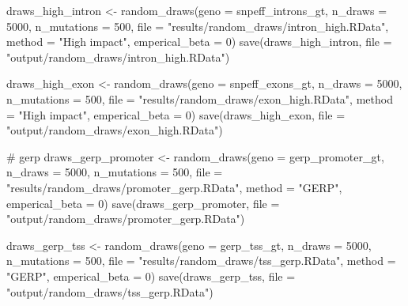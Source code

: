 \documentclass[
  letterpaper,
  DIV=11,
  numbers=noendperiod]{scrreprt}
\newenvironment{Shaded}{}{}
\newcommand{\AttributeTok}[1]{\textcolor[rgb]{0.84,0.23,0.29}{#1}}
\newcommand{\CommentTok}[1]{\textcolor[rgb]{0.42,0.45,0.49}{#1}}
\newcommand{\DecValTok}[1]{\textcolor[rgb]{0.00,0.36,0.77}{#1}}
\newcommand{\FunctionTok}[1]{\textcolor[rgb]{0.44,0.26,0.76}{#1}}
\newcommand{\NormalTok}[1]{\textcolor[rgb]{0.14,0.16,0.18}{#1}}
\newcommand{\OtherTok}[1]{\textcolor[rgb]{0.44,0.26,0.76}{#1}}
\newcommand{\StringTok}[1]{\textcolor[rgb]{0.01,0.18,0.38}{#1}}
\begin{document}
\begin{Shaded}
\begin{Highlighting}[]
\NormalTok{draws\_high\_intron }\OtherTok{\textless{}{-}} \FunctionTok{random\_draws}\NormalTok{(}\AttributeTok{geno =}\NormalTok{ snpeff\_introns\_gt, }\AttributeTok{n\_draws =} \DecValTok{5000}\NormalTok{, }\AttributeTok{n\_mutations =} \DecValTok{500}\NormalTok{, }\AttributeTok{file =} \StringTok{"results/random\_draws/intron\_high.RData"}\NormalTok{, }\AttributeTok{method =} \StringTok{"High impact"}\NormalTok{, }\AttributeTok{emperical\_beta =} \DecValTok{0}\NormalTok{)}
\FunctionTok{save}\NormalTok{(draws\_high\_intron, }\AttributeTok{file =} \StringTok{"output/random\_draws/intron\_high.RData"}\NormalTok{)}

\NormalTok{draws\_high\_exon }\OtherTok{\textless{}{-}} \FunctionTok{random\_draws}\NormalTok{(}\AttributeTok{geno =}\NormalTok{ snpeff\_exons\_gt, }\AttributeTok{n\_draws =} \DecValTok{5000}\NormalTok{, }\AttributeTok{n\_mutations =} \DecValTok{500}\NormalTok{, }\AttributeTok{file =} \StringTok{"results/random\_draws/exon\_high.RData"}\NormalTok{, }\AttributeTok{method =} \StringTok{"High impact"}\NormalTok{, }\AttributeTok{emperical\_beta =} \DecValTok{0}\NormalTok{)}
\FunctionTok{save}\NormalTok{(draws\_high\_exon, }\AttributeTok{file =} \StringTok{"output/random\_draws/exon\_high.RData"}\NormalTok{)}

\CommentTok{\# gerp}
\NormalTok{draws\_gerp\_promoter }\OtherTok{\textless{}{-}} \FunctionTok{random\_draws}\NormalTok{(}\AttributeTok{geno =}\NormalTok{ gerp\_promoter\_gt, }\AttributeTok{n\_draws =} \DecValTok{5000}\NormalTok{, }\AttributeTok{n\_mutations =} \DecValTok{500}\NormalTok{, }\AttributeTok{file =} \StringTok{"results/random\_draws/promoter\_gerp.RData"}\NormalTok{, }\AttributeTok{method =} \StringTok{"GERP"}\NormalTok{, }\AttributeTok{emperical\_beta =} \DecValTok{0}\NormalTok{)}
\FunctionTok{save}\NormalTok{(draws\_gerp\_promoter, }\AttributeTok{file =} \StringTok{"output/random\_draws/promoter\_gerp.RData"}\NormalTok{)}

\NormalTok{draws\_gerp\_tss }\OtherTok{\textless{}{-}} \FunctionTok{random\_draws}\NormalTok{(}\AttributeTok{geno =}\NormalTok{ gerp\_tss\_gt, }\AttributeTok{n\_draws =} \DecValTok{5000}\NormalTok{, }\AttributeTok{n\_mutations =} \DecValTok{500}\NormalTok{, }\AttributeTok{file =} \StringTok{"results/random\_draws/tss\_gerp.RData"}\NormalTok{, }\AttributeTok{method =} \StringTok{"GERP"}\NormalTok{, }\AttributeTok{emperical\_beta =} \DecValTok{0}\NormalTok{)}
\FunctionTok{save}\NormalTok{(draws\_gerp\_tss, }\AttributeTok{file =} \StringTok{"output/random\_draws/tss\_gerp.RData"}\NormalTok{)}


\end{Highlighting}
\end{Shaded}
\end{document}
